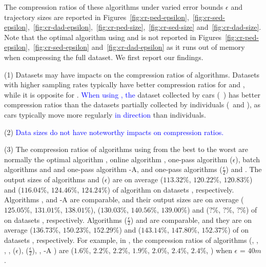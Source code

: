 The compression ratios of these algorithms under varied error bounds $\epsilon$ and trajectory sizes are reported in Figures~\ref{fig:cr-ped-epsilon},~\ref{fig:cr-sed-epsilon},~\ref{fig:cr-dad-epsilon},~\ref{fig:cr-ped-size},~\ref{fig:cr-sed-size} and~\ref{fig:cr-dad-size}.
{Note that the optimal algorithm using \sed and \dad is not reported in Figures~\ref{fig:cr-ped-epsilon},~\ref{fig:cr-sed-epsilon} and~\ref{fig:cr-dad-epsilon} as it runs out of memory when compressing the full dataset}. We first report our findings.


\sstab(1)  {Datasets may have impacts on the compression ratios of \lsa algorithms. Datasets with higher sampling rates typically have better compression ratios for \ped and \sed, while it is opposite for \dad. \textcolor{blue}{When using \dad, the} dataset collected by cars (\eg~\ucar) has better compression ratios than the datasets partially collected by individuals (\eg~\geolife and \mopsi), as cars typically move more regularly \textcolor{blue}{in direction} than individuals. }

\sstab(2) \textcolor{blue}{Data sizes do not have noteworthy impacts on compression ratios.}

\sstab(3) The compression ratios of algorithms using \ped from the best
to the worst are normally the optimal algorithm \opt, online algorithm \bqsa, one-pass algorithm \siped($\epsilon$), batch algorithms \tpa and \dpa and one-pass algorithm \operb-A, and one-pass algorithms \siped($\frac{\epsilon}{2}$) and \operb.
The output sizes of algorithms \bqsa and \siped({$\epsilon$}) are on average
($113.32\%$, $120.22\%$, $120.83\%$) and ($116.04\%$, $124.46\%$, $124.24\%$) of algorithm \opt
on datasets \dSets, respectively.
Algorithms \tpa, \dpa and \operb-A are comparable, and their output sizes are on average
($125.05\%$, $131.01\%$, $138.01\%$), ($130.03\%$, $140.56\%$, $139.00\%$) and \todo($?\%$, $?\%$, $?\%$) of \opt
on datasets \dSets, respectively.
Algorithms \siped($\frac{\epsilon}{2}$) and \operb are comparable, and they are on average
($136.73\%$, $150.23\%$, $152.29\%$) and ($143.14\%$, $147.80\%$, $152.37\%$) of \opt on datasets \dSets, respectively.
%
For example, in \mopsi, the compression ratios of algorithms
(\opt, \tpa, \dpa, \bqsa, \siped(${\epsilon}$), \siped($\frac{\epsilon}{2}$), \operb, {\operb-A} ) are ($1.6\%$, $2.2\%$, $2.2\%$, $1.9\%$, $2.0\%$, $2.4\%$, $2.4\%$, ) when $\epsilon$ = $40m$.
%



